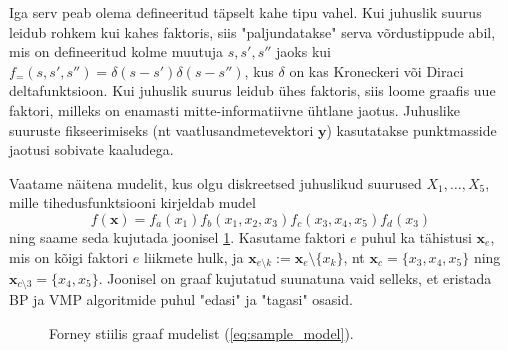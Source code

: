 Iga serv peab olema defineeritud täpselt kahe tipu vahel. Kui juhuslik suurus leidub rohkem kui kahes faktoris, siis "paljundatakse" serva võrdustippude abil, mis on defineeritud kolme muutuja $s,s',s''$ jaoks kui $f_=(s,s',s'') = \delta(s-s')\delta(s-s'')$, kus $\delta$ on kas Kroneckeri või Diraci deltafunktsioon. Kui juhuslik suurus leidub ühes faktoris, siis loome graafis uue faktori, milleks on enamasti mitte-informatiivne ühtlane jaotus. Juhuslike suuruste fikseerimiseks (nt vaatlusandmetevektori $\bm{y}$) kasutatakse punktmasside jaotusi sobivate kaaludega.

Vaatame näitena mudelit, kus olgu diskreetsed juhuslikud suurused $X_1,\ldots,X_5$, mille tihedusfunktsiooni kirjeldab mudel
\begin{equation}
    \label{eq:sample_model}
    f(\bm{x}) = f_a(x_1) f_b(x_1,x_2,x_3) f_c(x_3,x_4,x_5) f_d(x_3)
\end{equation}
ning saame seda kujutada joonisel \ref{fig:ffg_model}. Kasutame faktori $e$ puhul ka tähistusi $\bm{x}_e$, mis on kõigi faktori $e$ liikmete hulk, ja $\bm{x}_{e \setminus k} := \bm{x}_e \setminus \{x_k\}$, nt $\bm{x}_c = \{x_3,x_4,x_5\}$ ning $\bm{x}_{c\setminus 3} = \{x_4,x_5\} $. Joonisel on graaf kujutatud suunatuna vaid selleks, et eristada BP ja VMP algoritmide puhul "edasi" ja "tagasi" osasid.

\begin{figure}[!ht]
\centering
{}
\caption{Forney stiilis graaf mudelist (\ref{eq:sample_model}).}
\label{fig:ffg_model}
\end{figure}


